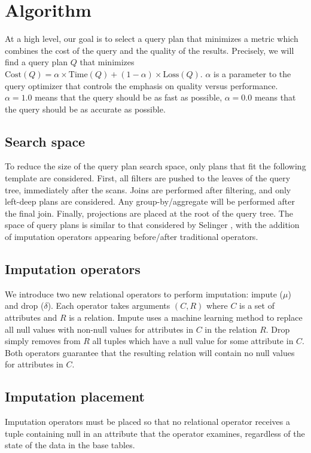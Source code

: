 \section{Algorithm}

At a high level, our goal is to select a query plan that minimizes a metric which combines the cost of the query and the quality of the results.
Precisely, we will find a query plan $Q$ that minimizes $\text{Cost}(Q) = \alpha \times \text{Time}(Q) + (1 - \alpha) \times \text{Loss}(Q)$. $\alpha$ is a parameter to the query optimizer that controls the emphasis on quality versus performance. $\alpha = 1.0$ means that the query should be as fast as possible, $\alpha=0.0$ means that the query should be as accurate as possible.

\subsection{Search space}
To reduce the size of the query plan search space, only plans that fit the following template are considered. First, all filters are pushed to the leaves of the query tree, immediately after the scans. Joins are performed after filtering, and only left-deep plans are considered. Any group-by/aggregate will be performed after the final join. Finally, projections are placed at the root of the query tree. The space of query plans is similar to that considered by Selinger , with the addition of imputation operators appearing before/after traditional operators.

\subsection{Imputation operators}
We introduce two new relational operators to perform imputation: impute ($\mu$) and drop ($\delta$). Each operator takes arguments $(C, R)$ where $C$ is a set of attributes and $R$ is a relation. Impute uses a machine learning method to replace all null values with non-null values for attributes in $C$ in the relation $R$. Drop simply removes from $R$ all tuples which have a null value for some attribute in $C$. Both operators guarantee that the resulting relation will contain no null values for attributes in $C$. 

\subsection{Imputation placement}
\label{sec:placement}
Imputation operators must be placed so that no relational operator receives a tuple containing null in an attribute that the operator examines, regardless of the state of the data in the base tables.

